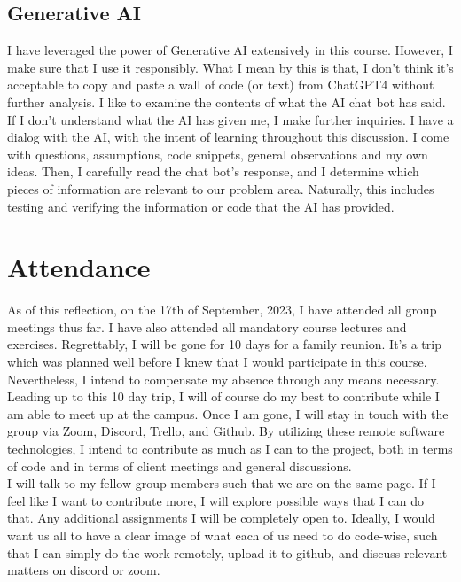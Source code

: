 \documentclass{exam}
\begin{document}
\subsection{Generative AI}
I have leveraged the power of Generative AI extensively in this course. However, I make sure that I use it responsibly. What I mean by this is that, I don't think it's acceptable to copy and paste a wall of code (or text) from ChatGPT4 without further analysis. I like to examine the contents of what the AI chat bot has said.\\
\bigskip
If I don't understand what the AI has given me, I make further inquiries. I have a dialog with the AI, with the intent of learning throughout this discussion. I come with questions, assumptions, code snippets, general observations and my own ideas. Then, I carefully read the chat bot's response, and I determine which pieces of information are relevant to our problem area. Naturally, this includes testing and verifying the information or code that the AI has provided.\\
\bigskip


\section{Attendance}
As of this reflection, on the 17th of September, 2023, I have attended all group meetings thus far. I have also attended all mandatory course lectures and exercises. Regrettably, I will be gone for 10 days for a family reunion. It's a trip which was planned well before I knew that I would participate in this course. Nevertheless, I intend to compensate my absence through any means necessary.\\
\bigskip
Leading up to this 10 day trip, I will of course do my best to contribute while I am able to meet up at the campus. Once I am gone, I will stay in touch with the group via Zoom, Discord, Trello, and Github. By utilizing these remote software technologies, I intend to contribute as much as I can to the project, both in terms of code and in terms of client meetings and general discussions.\\
\bigskip
I will talk to my fellow group members such that we are on the same page. If I feel like I want to contribute more, I will explore possible ways that I can do that. Any additional assignments I will be completely open to. Ideally, I would want us all to have a clear image of what each of us need to do code-wise, such that I can simply do the work remotely, upload it to github, and discuss relevant matters on discord or zoom.\\
\bigskip
\end{document}
